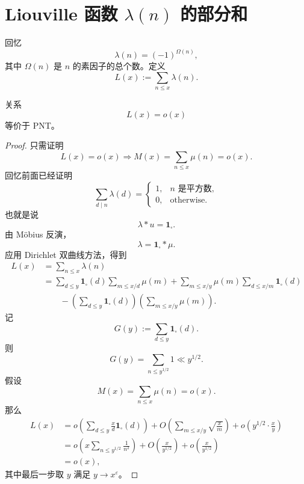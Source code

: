 \section{\texorpdfstring{Liouville 函数 \(\lambda(n)\) 的部分和}{Liouville 函数 lambda(n) 的部分和}}

回忆
\[
	\lambda(n)=(-1)^{\Omega(n)},
\]
其中 $\Omega(n)$ 是 $n$ 的素因子的总个数。定义
\[
	L(x):=\sum_{n\leq x}\lambda(n).
\]

\begin{theorem}[原文 Theorem 3.20]
	关系
	\[
		L(x)=o(x)
	\]
	等价于 PNT。
\end{theorem}

\begin{proof}
	只需证明
	\[
		L(x)=o(x)\Longrightarrow M(x)=\sum_{n\leq x}\mu(n)=o(x).
	\]
	回忆前面已经证明
	\[
		\sum_{d\mid n}\lambda(d)
		=
		\begin{cases}
			1, & n \text{ 是平方数},\\
			0, & \text{otherwise}.
		\end{cases}
	\]
	也就是说
	\[
		\lambda*u=\mathbf 1_{\square}.
	\]
	由 Möbius 反演，
	\[
		\lambda=\mathbf 1_{\square}*\mu.
	\]
	应用 Dirichlet 双曲线方法，得到
	\[
	\begin{aligned}
		L(x)
		&=
		\sum_{n\leq x}\lambda(n)\\
		&=
		\sum_{d\leq y}\mathbf 1_{\square}(d)
		\sum_{m\leq x/d}\mu(m)
		+
		\sum_{m\leq x/y}\mu(m)
		\sum_{d\leq x/m}\mathbf 1_{\square}(d)\\
		&\qquad
		-
		\left(\sum_{d\leq y}\mathbf 1_{\square}(d)\right)
		\left(\sum_{m\leq x/y}\mu(m)\right).
	\end{aligned}
	\]
	记
	\[
		G(y):=\sum_{d\leq y}\mathbf 1_{\square}(d).
	\]
	则
	\[
		G(y)=\sum_{n\leq y^{1/2}}1\ll y^{1/2}.
	\]
	假设
	\[
		M(x)=\sum_{n\leq x}\mu(n)=o(x).
	\]
	那么
	\[
	\begin{aligned}
		L(x)
		&=
		o\left(\sum_{d\leq y}\frac{x}{d}\mathbf 1_{\square}(d)\right)
		+
		O\left(\sum_{m\leq x/y}\sqrt{\frac{x}{m}}\right)
		+
		o\left(y^{1/2}\cdot\frac{x}{y}\right)\\
		&=
		o\left(x\sum_{n\leq y^{1/2}}\frac1{n^2}\right)
		+
		O\left(\frac{x}{y^{1/2}}\right)
		+
		o\left(\frac{x}{y^{1/2}}\right)\\
		&=o(x),
	\end{aligned}
	\]
	其中最后一步取 $y$ 满足 $y\to x^\varepsilon$。


\end{proof}
